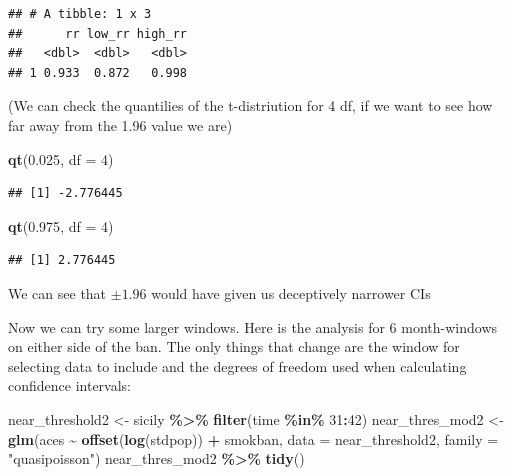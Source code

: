 \documentclass[
]{book}
\newenvironment{Shaded}{\begin{snugshade}}{\end{snugshade}}
\newcommand{\AttributeTok}[1]{\textcolor[rgb]{0.13,0.29,0.53}{#1}}
\newcommand{\DecValTok}[1]{\textcolor[rgb]{0.00,0.00,0.81}{#1}}
\newcommand{\FloatTok}[1]{\textcolor[rgb]{0.00,0.00,0.81}{#1}}
\newcommand{\FunctionTok}[1]{\textcolor[rgb]{0.13,0.29,0.53}{\textbf{#1}}}
\newcommand{\NormalTok}[1]{#1}
\newcommand{\OtherTok}[1]{\textcolor[rgb]{0.56,0.35,0.01}{#1}}
\newcommand{\SpecialCharTok}[1]{\textcolor[rgb]{0.81,0.36,0.00}{\textbf{#1}}}
\newcommand{\StringTok}[1]{\textcolor[rgb]{0.31,0.60,0.02}{#1}}
\begin{document}
\begin{verbatim}
## # A tibble: 1 x 3
##      rr low_rr high_rr
##   <dbl>  <dbl>   <dbl>
## 1 0.933  0.872   0.998
\end{verbatim}

(We can check the quantilies of the t-distriution for 4 df, if we want to see how far away from the 1.96 value we are)

\begin{Shaded}
\begin{Highlighting}[]
\FunctionTok{qt}\NormalTok{(}\FloatTok{0.025}\NormalTok{, }\AttributeTok{df =} \DecValTok{4}\NormalTok{)}
\end{Highlighting}
\end{Shaded}

\begin{verbatim}
## [1] -2.776445
\end{verbatim}

\begin{Shaded}
\begin{Highlighting}[]
\FunctionTok{qt}\NormalTok{(}\FloatTok{0.975}\NormalTok{, }\AttributeTok{df =} \DecValTok{4}\NormalTok{) }
\end{Highlighting}
\end{Shaded}

\begin{verbatim}
## [1] 2.776445
\end{verbatim}

We can see that \(\pm 1.96\) would have given us deceptively narrower CIs

Now we can try some larger windows. Here is the analysis for 6 month-windows
on either side of the ban. The only things that change are the window for selecting data to include and the degrees of freedom used when calculating confidence intervals:

\begin{Shaded}
\begin{Highlighting}[]
\NormalTok{near\_threshold2 }\OtherTok{\textless{}{-}}\NormalTok{ sicily }\SpecialCharTok{\%\textgreater{}\%} 
  \FunctionTok{filter}\NormalTok{(time }\SpecialCharTok{\%in\%} \DecValTok{31}\SpecialCharTok{:}\DecValTok{42}\NormalTok{)}
\NormalTok{near\_thres\_mod2 }\OtherTok{\textless{}{-}} \FunctionTok{glm}\NormalTok{(aces }\SpecialCharTok{\textasciitilde{}} \FunctionTok{offset}\NormalTok{(}\FunctionTok{log}\NormalTok{(stdpop)) }\SpecialCharTok{+}\NormalTok{ smokban, }
                      \AttributeTok{data =}\NormalTok{ near\_threshold2, }
                      \AttributeTok{family =} \StringTok{"quasipoisson"}\NormalTok{)}
\NormalTok{near\_thres\_mod2 }\SpecialCharTok{\%\textgreater{}\%} 
  \FunctionTok{tidy}\NormalTok{()}
\end{Highlighting}
\end{Shaded}
\end{document}
